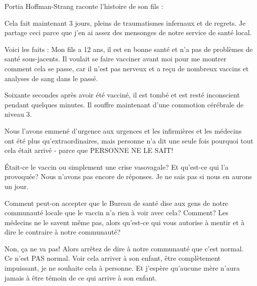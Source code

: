 Portia Hoffman-Strang raconte l'histoire de son fils :

Cela fait maintenant 3 jours, pleins de traumatismes infernaux et de regrets. Je
partage ceci parce que j'en ai assez des mensonges de notre service de santé
local.

Voici les faits : Mon fils a 12 ans, il est en bonne santé et n'a pas de
problèmes de santé sous-jacents. Il voulait se faire vacciner avant moi pour me
montrer comment cela se passe, car il n'est pas nerveux et a reçu de nombreux
vaccins et analyses de sang dans le passé.

Soixante secondes après avoir été vacciné, il est tombé et est resté inconscient
pendant quelques minutes. Il souffre maintenant d'une commotion cérébrale de
niveau 3.

Nous l'avons emmené d'urgence aux urgences et les infirmières et les médecins
ont été plus qu'extraordinaires, mais personne n'a dit une seule fois pourquoi
tout cela était arrivé - parce que PERSONNE NE LE SAIT!

Était-ce le vaccin ou simplement une crise vasovagale? Et qu'est-ce qui l'a
provoquée? Nous n'avons pas encore de réponses. Je ne sais pas si nous en aurons
un jour.

Comment peut-on accepter que le Bureau de santé dise aux gens de notre
communauté locale que le vaccin n'a rien à voir avec cela? Comment? Les médecins
ne le savent même pas, alors qu'est-ce qui vous autorise à mentir et à dire le
contraire à notre communauté?

Non, ça ne va pas! Alors arrêtez de dire à notre communauté que c'est normal. Ce
n'est PAS normal. Voir cela arriver à son enfant, être complètement impuissant,
je ne souhaite cela à personne. Et j'espère qu'aucune mère n'aura jamais à être
témoin de ce qui arrive à son enfant.

